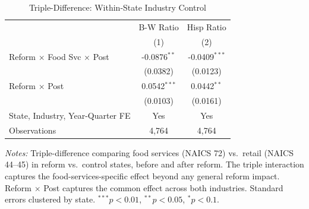 \begin{table}[htbp]
\centering
\caption{Triple-Difference: Within-State Industry Control}
\label{tab:ddd}
\begin{threeparttable}
\begin{tabular}{lcc}
\toprule
 & B-W Ratio & Hisp Ratio \\
 & (1) & (2) \\
\midrule
Reform $\times$ Food Svc $\times$ Post & -0.0876$^{**}$ & -0.0409$^{***}$ \\
 & (0.0382) & (0.0123) \\
[0.5em]
Reform $\times$ Post & 0.0542$^{***}$ & 0.0442$^{**}$ \\
 & (0.0103) & (0.0161) \\
\midrule
State, Industry, Year-Quarter FE & Yes & Yes \\
Observations & 4,764 & 4,764 \\
\bottomrule
\end{tabular}
\begin{tablenotes}[flushleft]\footnotesize
\item \textit{Notes:} Triple-difference comparing food services (NAICS 72) vs.\ retail (NAICS 44--45) in reform vs.\ control states, before and after reform. The triple interaction captures the food-services-specific effect beyond any general reform impact. Reform $\times$ Post captures the common effect across both industries. Standard errors clustered by state. $^{***}p<0.01$, $^{**}p<0.05$, $^{*}p<0.1$.
\end{tablenotes}
\end{threeparttable}
\end{table}
